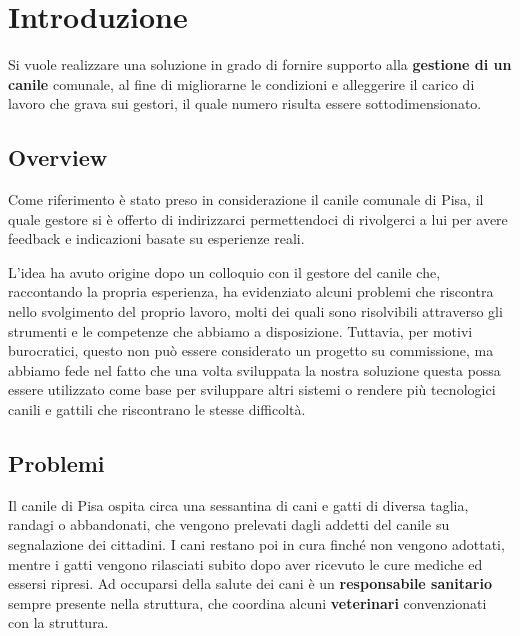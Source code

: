 \chapter{Introduzione}
Si vuole realizzare una soluzione in grado di fornire supporto alla
\textbf{gestione di un canile} comunale, al fine di migliorarne le condizioni e alleggerire il carico di lavoro che grava sui gestori, il quale numero risulta essere sottodimensionato.

\section{Overview}
Come riferimento è stato preso in considerazione il  canile comunale di Pisa, il quale gestore si è offerto di indirizzarci permettendoci di rivolgerci a lui per avere feedback e indicazioni basate su esperienze reali.

L'idea ha avuto origine dopo un colloquio con il gestore del canile che, raccontando la propria esperienza, ha evidenziato alcuni problemi che riscontra nello svolgimento del proprio lavoro, molti dei quali sono risolvibili attraverso gli strumenti e le competenze che abbiamo a disposizione. Tuttavia, per motivi burocratici, questo non può essere considerato un progetto su commissione, ma abbiamo fede nel fatto che una volta sviluppata la nostra soluzione questa possa essere utilizzato come base per sviluppare altri sistemi o rendere più tecnologici canili e gattili che riscontrano le stesse difficoltà.

\section{Problemi}
Il canile di Pisa ospita circa una sessantina di cani e gatti di diversa taglia, randagi o abbandonati, che vengono prelevati dagli addetti del canile su segnalazione dei cittadini. I cani restano poi in cura finché non vengono adottati, mentre i gatti vengono rilasciati subito dopo aver ricevuto le cure  mediche ed essersi ripresi. Ad occuparsi della salute dei cani è un \textbf{responsabile sanitario} sempre presente nella struttura, che coordina alcuni \textbf{veterinari} convenzionati con la struttura.

